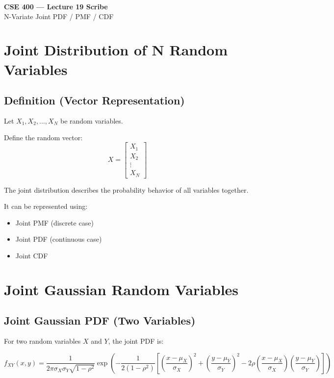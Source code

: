 \documentclass[11pt]{article}
\begin{document}
\begin{center}
{\Large \textbf{CSE 400 — Lecture 19 Scribe}}\\
\vspace{0.2em}
N-Variate Joint PDF / PMF / CDF
\end{center}

\section{Joint Distribution of N Random Variables}

\subsection{Definition (Vector Representation)}

Let $X_1, X_2, \ldots, X_N$ be random variables.

Define the random vector:
\[
X =
\begin{bmatrix}
X_1 \\
X_2 \\
\vdots \\
X_N
\end{bmatrix}
\]

The joint distribution describes the probability behavior of all variables together.

It can be represented using:
\begin{itemize}[noitemsep]
\item Joint PMF (discrete case)
\item Joint PDF (continuous case)
\item Joint CDF
\end{itemize}

\section{Joint Gaussian Random Variables}

\subsection{Joint Gaussian PDF (Two Variables)}

For two random variables $X$ and $Y$, the joint PDF is:

\[
f_{XY}(x,y) =
\frac{1}{2\pi \sigma_X \sigma_Y \sqrt{1-\rho^2}}
\exp\left(
-\frac{1}{2(1-\rho^2)}
\left[
\left(\frac{x-\mu_X}{\sigma_X}\right)^2
+
\left(\frac{y-\mu_Y}{\sigma_Y}\right)^2
-
2\rho \left(\frac{x-\mu_X}{\sigma_X}\right)\left(\frac{y-\mu_Y}{\sigma_Y}\right)
\right]
\right)
\]
\end{document}
